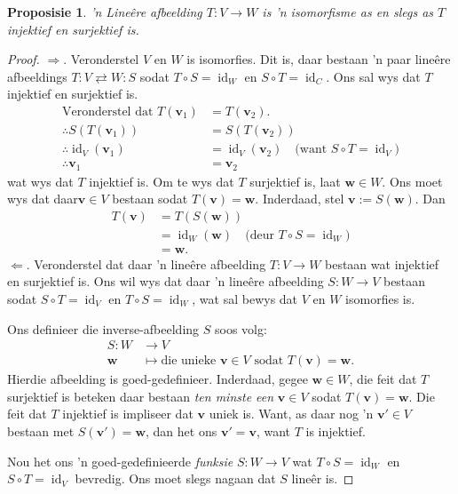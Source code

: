 \documentclass[a4paper,11pt]{book}
\newtheorem{proposition}[theorem]{Proposisie}
\theoremstyle{definition}
\newcommand{\ve}[1]{\mathbf{#1}}
\DeclareMathOperator{\id}{id}
\begin{document}
\begin{proposition} \label{iso-inj-surj} 'n Line{\^e}re afbeelding $T : V
	\rightarrow W$ is 'n isomorfisme as en slegs as $T$ injektief en
	surjektief is.
\end{proposition}
\begin{proof}
$\Rightarrow$. Veronderstel $V$ en $W$ is isomorfies. Dit is, daar bestaan
	'n paar line{\^e}re afbeeldings $T : V\rightleftarrows W : S$ sodat $T
	\circ S = \id_W$ en $S \circ T = \id_C$. Ons sal wys dat $T$ injektief
	en surjektief is.
	\begin{align*}
		\mbox{Veronderstel dat } T(\ve{v}_1) &= T(\ve{v}_2). \\
		\therefore S(T(\ve{v}_1)) &= S(T(\ve{v}_2)) \\
		\therefore \id_V(\ve{v}_1) &= \id_V(\ve{v}_2) \quad \mbox{(want $S
		\circ T = \id_V$)} \\
		\therefore \ve{v}_1 &= \ve{v}_2  
	\end{align*}
	wat wys dat $T$ injektief is. Om te wys dat $T$ surjektief is, laat
	$\ve{w} \in W$. Ons moet wys dat daar$\ve{v} \in V$ bestaan sodat
	$T(\ve{v}) = \ve{w}$. Inderdaad, stel $\ve{v} := S(\ve{w})$. Dan 
	\begin{align*}
		T(\ve{v}) &= T(S(\ve{w})) \\
		&= \id_W (\ve{w}) \quad \mbox{(deur $T \circ S = \id_W$)} \\
		&= \ve{w}. 
	\end{align*}
	$\Leftarrow$. Veronderstel dat daar 'n line{\^e}re afbeelding $T : V
	\rightarrow W$ bestaan wat injektief en surjektief is. Ons wil wys dat
	daar 'n line{\^e}re afbeelding $S : W \rightarrow V$ bestaan sodat $S
	\circ T = \id_V$ en $T \circ S = \id_W$, wat sal bewys dat $V$ en $W$
	isomorfies is.

	Ons definieer die inverse-afbeelding $S$ soos volg:
	\begin{align*}
		S : W & \rightarrow V \\
		\ve{w} & \mapsto \mbox{die unieke $\ve{v} \in V$ sodat $T(\ve{v}) =
		\ve{w}$.}
	\end{align*}
	Hierdie afbeelding is goed-gedefinieer. Inderdaad, gegee $\ve{w} \in
	W$, die feit dat $T$ surjektief is beteken daar bestaan \emph{ten
	minste een} $\ve{v} \in V$ sodat $T(\ve{v}) = \ve{w}$. Die feit dat $T$
	injektief is impliseer dat $\ve{v}$ uniek is. Want, as daar nog 'n
	$\ve{v}' \in V$ bestaan met $S(\ve{v}') = \ve{w}$, dan het ons $\ve{v}'
	= \ve{v}$, want $T$ is injektief. 

	Nou het ons 'n goed-gedefinieerde \emph{funksie} $S : W \rightarrow V$
	wat $T \circ S = \id_W$ en $S \circ T = \id_V$ bevredig. Ons moet slegs
	nagaan dat $S$ line{\^e}r is. 


\end{proof}
\end{document}
